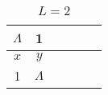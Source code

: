 
\begin{table}
  \centering
  \caption{$L = 2$}
  \begin{tabular}{|c|c|c|c|c|c|}
    \hline
    $\Lambda$ & 1 & & & & \\ \hline
    $x$ & $y$ & & & & \\ \hline
    1 & $\Lambda$ & & & & \\ \hline
  \end{tabular}
\end{table}